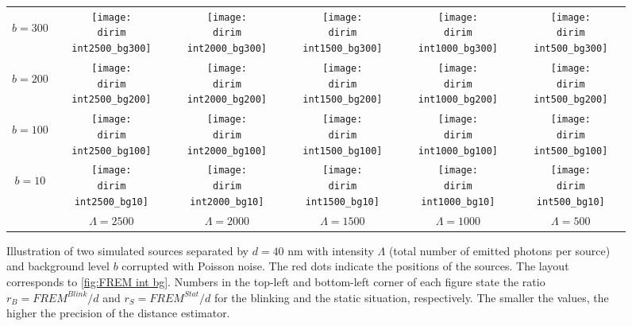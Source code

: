 %
\begin{figure}[!hbt]
	\centering
	\newcommand{\wf}{.15\textwidth}
	\newcommand{\dirim}{\qd gFREM/images/psf2/text_twosources_}
	\newcommand{\vs}{.4}
	\begin{tabular}{c|ccccc}
		\begin{sideways}\hspace{\vs cm}$b=300$\end{sideways}
		&\texttt{[image: \\dirim int2500\_bg300]}
		&\texttt{[image: \\dirim int2000\_bg300]}
		&\texttt{[image: \\dirim int1500\_bg300]}
		&\texttt{[image: \\dirim int1000\_bg300]}
		&\texttt{[image: \\dirim int500\_bg300]}\\
		\begin{sideways}\hspace{\vs cm}$b=200$\end{sideways}
		&\texttt{[image: \\dirim int2500\_bg200]}
		&\texttt{[image: \\dirim int2000\_bg200]}
		&\texttt{[image: \\dirim int1500\_bg200]}
		&\texttt{[image: \\dirim int1000\_bg200]}
		&\texttt{[image: \\dirim int500\_bg200]}\\
		\begin{sideways}\hspace{\vs cm}$b=100$\end{sideways}
		&\texttt{[image: \\dirim int2500\_bg100]}
		&\texttt{[image: \\dirim int2000\_bg100]}
		&\texttt{[image: \\dirim int1500\_bg100]}
		&\texttt{[image: \\dirim int1000\_bg100]}
		&\texttt{[image: \\dirim int500\_bg100]}\\
		\begin{sideways}\hspace{\vs cm}$b=10$\end{sideways}
		&\texttt{[image: \\dirim int2500\_bg10]}
		&\texttt{[image: \\dirim int2000\_bg10]}
		&\texttt{[image: \\dirim int1500\_bg10]}
		&\texttt{[image: \\dirim int1000\_bg10]}
		&\texttt{[image: \\dirim int500\_bg10]}\\
		\hline	
		&$\Lambda=2500$ & $\Lambda=2000$ & $\Lambda=1500$ & $\Lambda=1000$ & $\Lambda=500$\\
	\end{tabular}
	\caption{Illustration of two simulated sources separated by $d=40$ nm  with intensity $\Lambda$ (total number of emitted photons per source) and background level $b$ corrupted with Poisson noise. The red dots indicate the positions of the sources. The layout corresponds to \autoref{fig:FREM int bg}. Numbers in the top-left and bottom-left corner of each figure state the ratio $r_B=\unit{FREM}^{Blink}/d$ and $r_S=\unit{FREM}^{Stat}/d$ for the blinking and the static situation, respectively. The smaller the values, the higher the precision of the distance estimator.}
	\label{fig:two sources int bg}
\end{figure}
